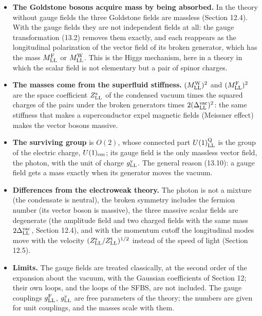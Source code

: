 \documentclass[
  10pt,
]{article}
\providecommand{\tightlist}{%
  \setlength{\itemsep}{0pt}\setlength{\parskip}{0pt}}
\begin{document}
\begin{itemize}
\tightlist
\item
  \textbf{The Goldstone bosons acquire mass by being absorbed.} In the
  theory without gauge fields the three Goldstone fields are massless
  (Section 12.4). With the gauge fields they are not independent fields
  at all: the gauge transformation (13.2) removes them exactly, and each
  reappears as the longitudinal polarization of the vector field of its
  broken generator, which has the mass \(M^{\rm F}_{\rm LL}\) or
  \(M^{\rm W}_{\rm LL}\). This is the Higgs mechanism, here in a theory
  in which the scalar field is not elementary but a pair of spinor
  charges.
\item
  \textbf{The masses come from the superfluid stiffness.}
  \((M^{\rm W}_{\rm LL})^2\) and \((M^{\rm F}_{\rm LL})^2\) are the
  space coefficient \(Z^{\rm s}_{\rm LL}\) of the condensed vacuum times
  the squared charges of the pairs under the broken generators times
  \(2(\Delta^{\rm vac}_{\rm LL})^2\): the same stiffness that makes a
  superconductor expel magnetic fields (Meissner effect) makes the
  vector bosons massive.
\item
  \textbf{The surviving group} is \(O(2)\), whose connected part
  \(U(1)^{\rm Q}_{\rm LL}\) is the group of the electric charge,
  \(U(1)_{\rm em}\); its gauge field is the only massless vector field,
  the photon, with the unit of charge \(g^{\rm v}_{\rm LL}\). The
  general reason (13.10): a gauge field gets a mass exactly when its
  generator moves the vacuum.
\item
  \textbf{Differences from the electroweak theory.} The photon is not a
  mixture (the condensate is neutral), the broken symmetry includes the
  fermion number (its vector boson is massive), the three massive scalar
  fields are degenerate (the amplitude field and two charged fields with
  the same mass \(2\Delta^{\rm vac}_{\rm LL}\), Section 12.4), and with
  the momentum cutoff the longitudinal modes move with the velocity
  \((Z^{\rm s}_{\rm LL}/Z^{\rm t}_{\rm LL})^{1/2}\) instead of the speed
  of light (Section 12.5).
\item
  \textbf{Limits.} The gauge fields are treated classically, at the
  second order of the expansion about the vacuum, with the Gaussian
  coefficients of Section 12; their own loops, and the loops of the
  SFBS, are not included. The gauge couplings \(g^{\rm F}_{\rm LL}\),
  \(g^{\rm v}_{\rm LL}\) are free parameters of the theory; the numbers
  are given for unit couplings, and the masses scale with them.
\end{itemize}
\end{document}
